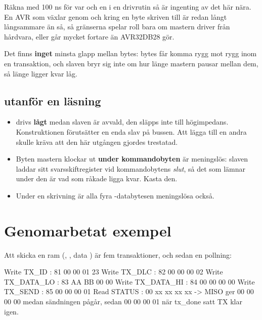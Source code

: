 Räkna med 100 ns för var och en i en drivrutin så är ingenting av det här nära. En AVR som växlar
 genom  och  kring en byte skriven till
 är redan långt långsammare än så, så gränserna spelar roll bara om mastern driver
 från hårdvara, eller går mycket fortare än AVR32DB28 gör.

Det finns \textbf{inget} minsta glapp mellan bytes: bytes får komma rygg mot rygg inom en
transaktion, och slaven bryr sig inte om hur länge mastern pausar mellan dem, så länge 
ligger kvar låg.

\subsection{ utanför en läsning}
\label{app:protocol:miso}

\begin{itemize}
  \item {} drivs \textbf{lågt} medan slaven är avvald, den släpps inte till högimpedans.
    Konstruktionen förutsätter en enda slav på bussen. Att lägga till en andra skulle kräva att den
    här utgången gjordes trestatad.
  \item Byten mastern klockar ut \textbf{under kommandobyten} är meningslös: slaven laddar sitt
    svarsskiftregister vid kommandobytens \emph{slut}, så det som lämnar under den är vad som råkade
    ligga kvar. Kasta den.
  \item Under en skrivning är alla fyra -databytesen meningslösa också.
\end{itemize}

\section{Genomarbetat exempel}
\label{app:protocol:example}

Att skicka en ram (, , data ) är fem transaktioner, och sedan
en pollning:

\begin{widedrawing}
Write TX_ID      : 81 00 00 01 23
Write TX_DLC     : 82 00 00 00 02
Write TX_DATA_LO : 83 AA BB 00 00
Write TX_DATA_HI : 84 00 00 00 00
Write TX_SEND    : 85 00 00 00 01
Read  STATUS     : 00 xx xx xx xx   -> MISO ger 00 00 00 00 medan sändningen pågår,
                                       sedan 00 00 00 01 när tx_done satt TX klar igen.
\end{widedrawing}

